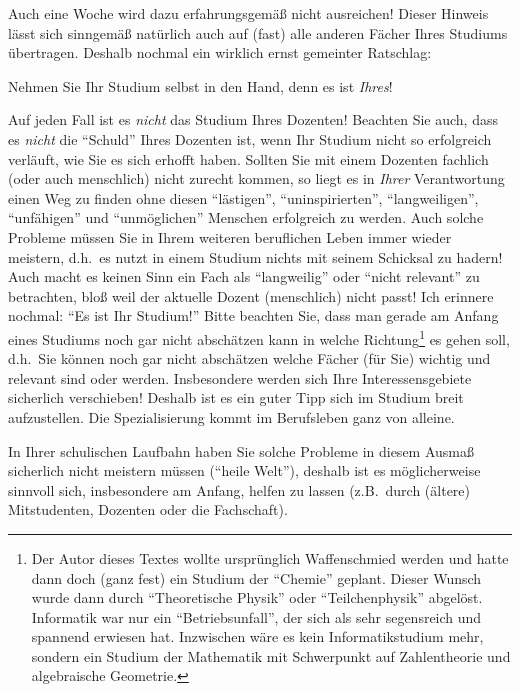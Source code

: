 Auch eine Woche wird dazu erfahrungsgemäß nicht ausreichen! Dieser
Hinweis lässt sich sinngemäß natürlich auch auf (fast) alle anderen
Fächer Ihres Studiums übertragen. Deshalb nochmal ein wirklich ernst gemeinter 
Ratschlag:
\begin{center}
	\large Nehmen Sie Ihr Studium selbst in den Hand, denn es ist \emph{Ihres}!
\end{center}
Auf jeden Fall ist es \emph{nicht} das Studium Ihres Dozenten! Beachten Sie auch, dass 
es \emph{nicht} die "`Schuld"' Ihres Dozenten ist, wenn Ihr Studium nicht so erfolgreich
verläuft, wie Sie es sich erhofft haben. Sollten Sie mit einem Dozenten fachlich (oder 
auch menschlich) nicht zurecht kommen, so liegt es in \emph{Ihrer} Verantwortung einen Weg zu finden ohne diesen "`lästigen"', "`uninspirierten"', "`langweiligen"', "`unfähigen"' und  "`unmöglichen"' Menschen erfolgreich zu werden. Auch solche 
Probleme müssen Sie in Ihrem weiteren beruflichen Leben immer wieder meistern, 
d.h.~es nutzt in einem Studium nichts mit seinem Schicksal zu hadern! Auch macht es 
keinen Sinn ein  Fach als "`langweilig"' oder "`nicht relevant"' zu betrachten, bloß weil 
der aktuelle  Dozent (menschlich) nicht passt! Ich erinnere nochmal: "`Es ist Ihr 
Studium!"' Bitte beachten Sie, dass man gerade am Anfang eines Studiums noch gar 
nicht abschätzen kann in welche Richtung\footnote{Der Autor dieses Textes wollte ursprünglich Waffenschmied werden und hatte dann doch (ganz 
fest) ein Studium der "`Chemie"' geplant. Dieser Wunsch wurde dann durch "`Theoretische Physik"' oder "`Teilchenphysik"' abgelöst. Informatik war nur ein "`Betriebsunfall"', der sich als sehr segensreich und spannend erwiesen hat. Inzwischen wäre es kein  Informatikstudium mehr,  sondern ein Studium der Mathematik mit Schwerpunkt auf Zahlentheorie und  algebraische Geometrie.} es gehen soll, d.h.~Sie können noch gar nicht abschätzen welche Fächer (für Sie) wichtig und relevant sind oder werden. Insbesondere werden sich Ihre Interessensgebiete sicherlich verschieben! Deshalb ist es ein guter Tipp sich im Studium breit aufzustellen. Die Spezialisierung kommt im Berufsleben ganz von alleine.

In Ihrer schulischen Laufbahn haben Sie solche Probleme  in diesem Ausmaß sicherlich 
nicht meistern müssen ("`heile Welt"'),  deshalb ist es möglicherweise sinnvoll 
sich, insbesondere am Anfang, helfen zu lassen (z.B.~durch (ältere) Mitstudenten,  Dozenten 
oder die Fachschaft).

\goodbreak
\bigskip


